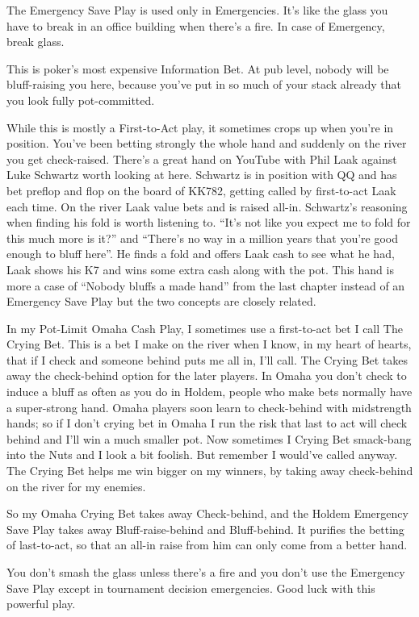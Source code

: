 The Emergency Save Play is used only in Emergencies. It's like the
glass you have to break in an office building when there's a fire. In
case of Emergency, break glass.

This is poker's most expensive Information Bet. At pub level, nobody
will be bluff-raising you here, because you've put in so much of your
stack already that you look fully pot-committed.

While this is mostly a First-to-Act play, it sometimes crops up when
you're in position. You've been betting strongly the whole hand and
suddenly on the river you get check-raised. There's a great hand on
YouTube with Phil Laak against Luke Schwartz worth looking at here.
Schwartz is in position with QQ and has bet preflop and flop on the
board of KK782, getting called by first-to-act Laak each time.
On the river Laak value bets and is raised all-in. Schwartz's
reasoning when finding his fold is worth listening to. ``It's not like
you expect me to fold for this much more is it?'' and ``There's no way
in a million years that you're good enough to bluff here''. He finds a
fold and offers Laak cash to see what he had, Laak shows his K7 and
wins some extra cash along with the pot. This hand is more a case of
``Nobody bluffs a made hand'' from the last chapter instead of
an Emergency Save Play but the two concepts are closely related.

In my Pot-Limit Omaha Cash Play, I sometimes use a first-to-act bet
I call The Crying Bet. This is a bet I make on the river when I
know, in my heart of hearts, that if I check and someone behind puts me
all in, I'll call. The Crying Bet takes away the check-behind option
for the later players. In Omaha you don't check to induce a bluff as
often as you do in Holdem, people who make bets normally have a
super-strong hand. Omaha players soon learn to check-behind with
midstrength hands; so if I don't crying bet in Omaha I run the
risk that last to act will check behind and I'll win a much smaller
pot. Now sometimes I Crying Bet smack-bang into the
Nuts and I look a bit foolish. But remember I would've called
anyway. The Crying Bet helps me win bigger on my winners, by
taking away check-behind on the river for my enemies.

So my Omaha Crying Bet takes away Check-behind, and the Holdem
Emergency Save Play takes away Bluff-raise-behind and Bluff-behind. It
purifies the betting of last-to-act, so that an all-in raise from him
can only come from a better hand.

You don't smash the glass unless there's a fire and you don't use the
Emergency Save Play except in tournament decision emergencies. Good
luck with this powerful play.
